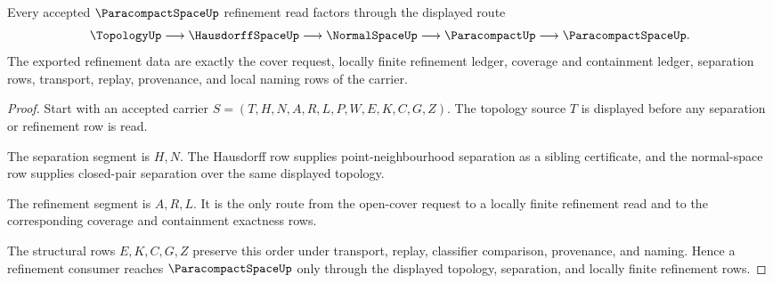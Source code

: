 \begin{theorem}
\label{thm:paracompact-space-locally-finite-refinement-route}
Every accepted $\ParacompactSpaceUp$ refinement read factors through the displayed route
$$
\TopologyUp \longrightarrow \HausdorffSpaceUp \longrightarrow \NormalSpaceUp \longrightarrow \ParacompactUp \longrightarrow \ParacompactSpaceUp .
$$
The exported refinement data are exactly the cover request, locally finite refinement ledger, coverage and containment ledger, separation rows, transport, replay, provenance, and local naming rows of the carrier.
\end{theorem}
\begin{proof}
Start with an accepted carrier $S=(T,H,N,A,R,L,P,W,E,K,C,G,Z)$. The topology source $T$ is displayed before any separation or refinement row is read.

The separation segment is $H,N$. The Hausdorff row supplies point-neighbourhood separation as a sibling certificate, and the normal-space row supplies closed-pair separation over the same displayed topology.

The refinement segment is $A,R,L$. It is the only route from the open-cover request to a locally finite refinement read and to the corresponding coverage and containment exactness rows.

The structural rows $E,K,C,G,Z$ preserve this order under transport, replay, classifier comparison, provenance, and naming. Hence a refinement consumer reaches $\ParacompactSpaceUp$ only through the displayed topology, separation, and locally finite refinement rows.
\end{proof}


